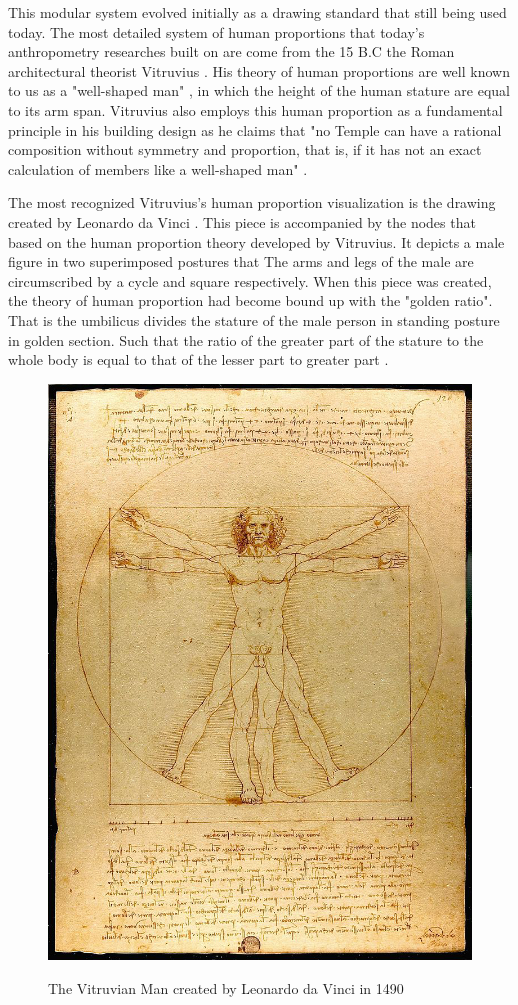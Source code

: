 This modular system evolved initially as a drawing standard that still being used today. The most detailed system of human proportions that today's anthropometry researches built on are come from the 15 B.C the Roman architectural theorist Vitruvius \cite{selin2008encyclopaedia}. His theory of human proportions are well known to us as a "well-shaped man" \cite{Rudolf1955}, in which the height of the human stature are equal to its arm span. Vitruvius also employs this human proportion as a fundamental principle in his building design as he claims that "no Temple can have a rational composition without symmetry and proportion, that is, if it has not an exact calculation of members like a well-shaped man" \cite{pollio1914ten, Marcus2002}.

The most recognized Vitruvius's human proportion visualization is the drawing created by Leonardo da Vinci \cite{stemp2006secret}. This piece is accompanied by the nodes that based on the human proportion theory developed by Vitruvius. It depicts a male figure in two superimposed postures that The arms and legs of the male are circumscribed by a cycle and square respectively. When this piece was created, the theory of human proportion had become bound up with the "golden ratio". That is the umbilicus divides the stature of the male person in standing posture in golden section. Such that the ratio of the greater part of the stature to the whole body is equal to that of the lesser part to greater part \cite{stemp2006secret}.

\begin{figure}[ht]
    \centering
	\includegraphics[width=0.7\columnwidth]{../images/Da_Vinci}\\[1cm]
    \caption{The Vitruvian Man created by Leonardo da Vinci in 1490 \cite{stemp2006secret}}
    \label{figure:fig2}
\end{figure}

